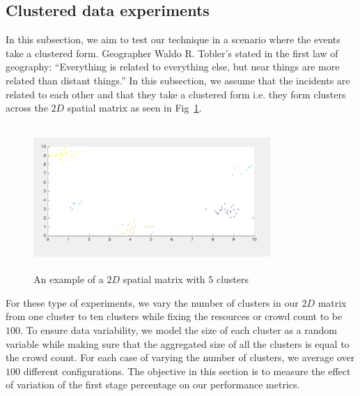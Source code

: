 \documentclass{acm_proc_article-sp}
\begin{document}
\subsection{Clustered data experiments}
In this subsection, we aim to test our technique in a scenario where the events take a clustered form. Geographer Waldo R. Tobler's stated in the first law of geography: ``Everything is related to everything else, but near things are more related than distant things.'' In this subsection, we assume that the incidents are related to each other and that they take a clustered form i.e. they form clusters across the $2D$ spatial matrix as seen in Fig~\ref{fig: clust}. \par
\begin{figure}[!h]
\centering
  \includegraphics[width=9cm ,height=5.5cm]{figuresPng/clust.png}
  \caption{An example of a $2D$ spatial matrix with $5$ clusters }\label{fig: clust}
\end{figure}
For these type of experiments, we vary the number of clusters in our $2D$ matrix from one cluster to ten clusters while fixing the resources or crowd count to be $100$. To ensure data variability, we model the size of each cluster as a random variable while making sure that the aggregated size of all the clusters is equal to the crowd count. For each case of varying the number of clusters, we average over $100$ different configurations. The objective in this section is to measure the effect of variation of the first stage percentage on our performance metrics.\par
\end{document}
